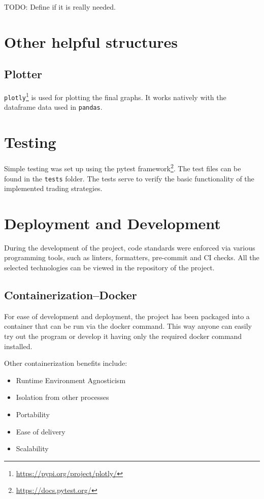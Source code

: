 TODO: Define if it is really needed.

\section{Other helpful structures}

\subsection*{Plotter}
\texttt{plotly}\footnote{\url{https://pypi.org/project/plotly/}} is used for plotting the final graphs. It works natively with the dataframe data used in \texttt{pandas}.

\section{Testing}
Simple testing was set up using the pytest framework\footnote{\url{https://docs.pytest.org/}}. The test files can be found in the \texttt{tests} folder. The tests serve to verify the basic functionality of the implemented trading strategies.

\section{Deployment and Development}
During the development of the project, code standards were enforced via various programming tools, such as linters, formatters, pre-commit and CI checks. All the selected technologies can be viewed in the repository of the project.

\subsection*{Containerization--Docker}
For ease of development and deployment, the project has been packaged into a container that can be run via the docker command. This way anyone can easily try out the program or develop it having only the required docker command installed.

Other containerization benefits include:
\begin{itemize}
    \item Runtime Environment Agnosticism
    \item Isolation from other processes
    \item Portability
    \item Ease of delivery
    \item Scalability
\end{itemize}

